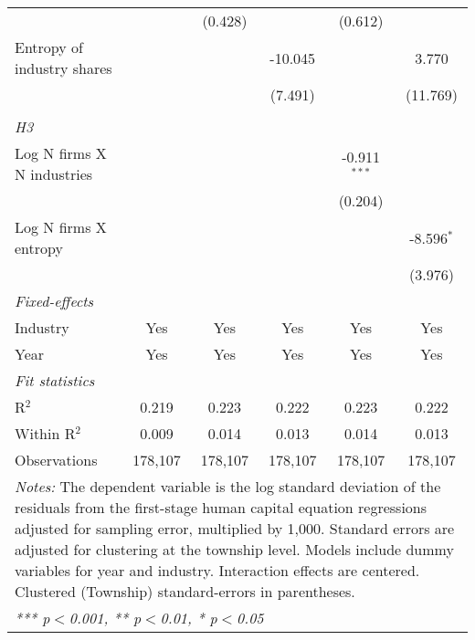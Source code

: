 \begin{tabular}{lccccc}
                                        &                 & (0.428)         &                 & (0.612)         &   \\   
   Entropy of industry shares           &                 &                 & -10.045         &                 & 3.770\\   
                                        &                 &                 & (7.491)         &                 & (11.769)\\   
\hdashline %
\\[0.1ex] %
\emph{H3} \\ 
   Log N firms X N industries           &                 &                 &                 & -0.911$^{***}$  &   \\   
                                        &                 &                 &                 & (0.204)         &   \\   
   Log N firms X entropy                &                 &                 &                 &                 & -8.596$^{*}$\\   
                                        &                 &                 &                 &                 & (3.976)\\   
   \midrule
   \emph{Fixed-effects}\\
   Industry                             & Yes             & Yes             & Yes             & Yes             & Yes\\  
   Year                                 & Yes             & Yes             & Yes             & Yes             & Yes\\  
   \midrule
   \emph{Fit statistics}\\
   R$^2$                                & 0.219           & 0.223           & 0.222           & 0.223           & 0.222\\  
   Within R$^2$                         & 0.009           & 0.014           & 0.013           & 0.014           & 0.013\\  
   Observations                         & 178,107         & 178,107         & 178,107         & 178,107         & 178,107\\  
   \midrule \midrule
\multicolumn{6}{p{16cm}}{\emph{Notes:} The dependent variable is the log 
    standard deviation of the residuals from the first-stage human capital equation 
    regressions adjusted for sampling error, multiplied by 1,000. Standard errors 
    are adjusted for clustering at the township level. Models include dummy variables 
    for year and industry. Interaction effects are centered. Clustered (Township) 
    standard-errors in parentheses.}\\
\multicolumn{6}{l}{\emph{*** p$<$0.001, ** p$<$0.01, * p$<$0.05}} \\ 
\end{tabular}
\par\endgroup
